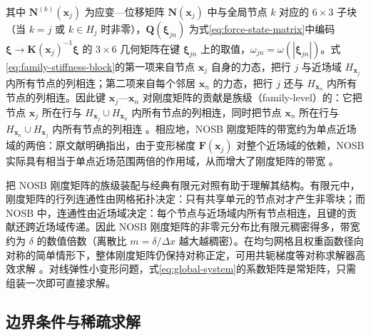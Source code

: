 其中 $\mathbf{N}^{(k)}(\mathbf{x}_j)$ 为应变—位移矩阵 $\mathbf{N}(\mathbf{x}_j)$ 中与全局节点 $k$ 对应的 $6\times 3$ 子块（当 $k=j$ 或 $k\in H_j$ 时非零），$\mathbf{Q}(\boldsymbol{\xi}_{jn})$ 为式\eqref{eq:force-state-matrix}中编码 $\boldsymbol{\xi}\to\mathbf{K}(\mathbf{x}_j)^{-1}\boldsymbol{\xi}$ 的 $3\times 6$ 几何矩阵在键 $\boldsymbol{\xi}_{jn}$ 上的取值，$\omega_{jn}=\omega(|\boldsymbol{\xi}_{jn}|)$。式\eqref{eq:family-stiffness-block}的第一项来自节点 $\mathbf{x}_j$ 自身的力态，把行 $j$ 与近场域 $H_{\mathbf{x}_j}$ 内所有节点的列相连；第二项来自每个邻居 $\mathbf{x}_n$ 的力态，把行 $j$ 还与 $H_{\mathbf{x}_n}$ 内所有节点的列相连。因此键 $\mathbf{x}_j$—$\mathbf{x}_n$ 对刚度矩阵的贡献是族级（family-level）的：它把节点 $\mathbf{x}_j$ 所在行与 $H_{\mathbf{x}_j}\cup H_{\mathbf{x}_n}$ 内所有节点的列相连，同时把节点 $\mathbf{x}_n$ 所在行与 $H_{\mathbf{x}_n}\cup H_{\mathbf{x}_j}$ 内所有节点的列相连 \cite{Breitenfeld2014,BreitenfeldThesis2014}。相应地，NOSB 刚度矩阵的带宽约为单点近场域的两倍：原文献明确指出，由于变形梯度 $\mathbf{F}(\mathbf{x}_j)$ 对整个近场域的依赖，NOSB 实际具有相当于单点近场范围两倍的作用域，从而增大了刚度矩阵的带宽 \cite{Breitenfeld2014}。

\begin{remark}
  把 NOSB 刚度矩阵的族级装配与经典有限元对照有助于理解其结构。有限元中，刚度矩阵的行列连通性由网格拓扑决定：只有共享单元的节点对才产生非零块；而 NOSB 中，连通性由近场域决定：每个节点与近场域内所有节点相连，且键的贡献还跨近场域传递。因此 NOSB 刚度矩阵的非零元分布比有限元稠密得多，带宽约为 $\delta$ 的数值倍数（离散比 $m=\delta/\Delta x$ 越大越稠密）。在均匀网格且权重函数径向对称的简单情形下，整体刚度矩阵仍保持对称正定，可用共轭梯度等对称求解器高效求解 \cite{Breitenfeld2014,BreitenfeldThesis2014}。对线弹性小变形问题，式\eqref{eq:global-system}的系数矩阵是常矩阵，只需组装一次即可直接求解。
\end{remark}

\subsection{边界条件与稀疏求解}\label{sec:implicit-bc-solve}

